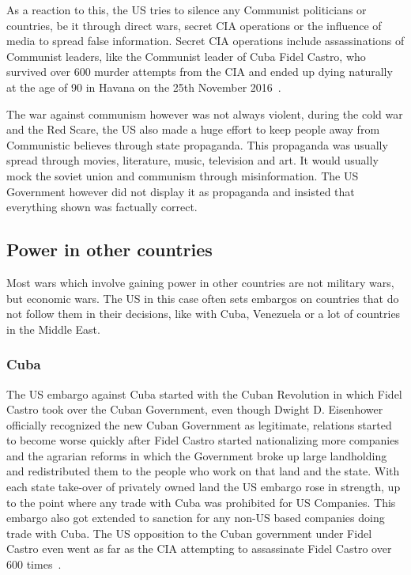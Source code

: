 \documentclass[12pt,a4paper]{article}
\begin{document}
		As a reaction to this, the US tries to silence any Communist politicians or countries, be it through direct wars, secret CIA operations or the influence of media to spread false information. Secret CIA operations include assassinations of Communist leaders, like the Communist leader of Cuba Fidel Castro, who survived over 600 murder attempts from the CIA and ended up dying naturally at the age of 90 in Havana on the 25th November 2016~\cite{cnn-fidel-castro-assassination}.
		
		The war against communism however was not always violent, during the cold war and the Red Scare, the US also made a huge effort to keep people away from Communistic believes through state propaganda.
		This propaganda was usually spread through movies, literature, music, television and art. It would usually mock the soviet union and communism through misinformation. The US Government however did not display it as propaganda and insisted that everything shown was factually correct.
		
		\subsection{Power in other countries}
		Most wars which involve gaining power in other countries are not military wars, but economic wars. The US in this case often sets embargos on countries that do not follow them in their decisions, like with Cuba, Venezuela or a lot of countries in the Middle East.
		\subsubsection{Cuba}
		The US embargo against Cuba started with the Cuban Revolution in which Fidel Castro took over the Cuban Government, even though Dwight D. Eisenhower officially recognized the new Cuban Government as legitimate, relations started to become worse quickly after Fidel Castro started nationalizing more companies and the agrarian reforms in which the Government broke up large landholding and redistributed them to the people who work on that land and the state. With each state take-over of privately owned land the US embargo rose in strength, up to the point where any trade with Cuba was prohibited for US Companies. This embargo also got extended to sanction for any non-US based companies doing trade with Cuba. The US opposition to the Cuban government under Fidel Castro even went as far as the CIA attempting to assassinate Fidel Castro over 600 times~\cite{cnn-fidel-castro-assassination}.
		
\end{document}
